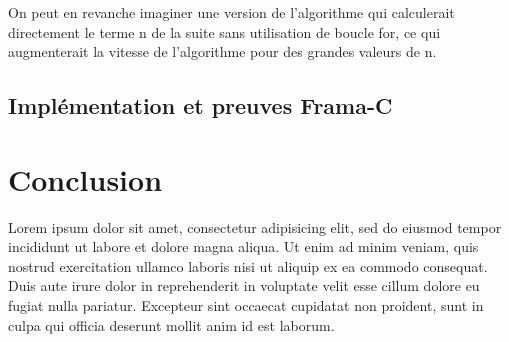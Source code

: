 \documentclass[a4paper,11pt, oneside]{book}
\begin{document}
		On peut en revanche imaginer une version de l'algorithme qui calculerait
		directement le terme n de la suite sans utilisation de boucle for, ce qui
		augmenterait la vitesse de l'algorithme pour des grandes valeurs de n.


		\section{Implémentation et preuves Frama-C}

	\chapter{Conclusion}
		Lorem ipsum dolor sit amet, consectetur adipisicing elit, sed do eiusmod tempor incididunt ut labore et dolore magna aliqua. Ut enim ad minim veniam, quis nostrud exercitation ullamco laboris nisi ut aliquip ex ea commodo consequat. Duis aute irure dolor in reprehenderit in voluptate velit esse cillum dolore eu fugiat nulla pariatur. Excepteur sint occaecat cupidatat non proident, sunt in culpa qui officia deserunt mollit anim id est laborum.
\end{document}
